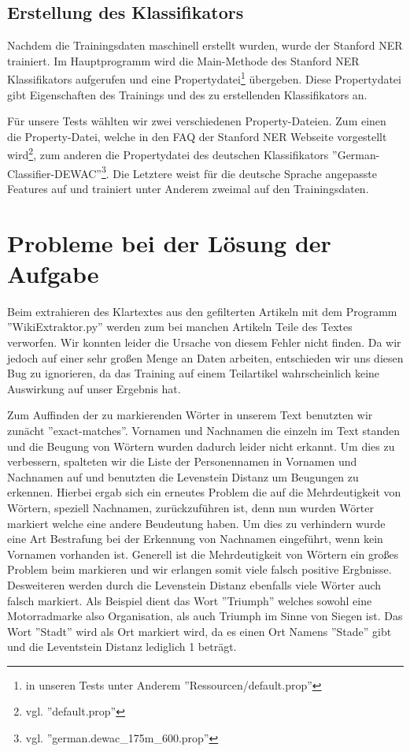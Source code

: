 \documentclass[a4paper]{article}
\begin{document}
	\subsection{Erstellung des Klassifikators}
		Nachdem die Trainingsdaten maschinell erstellt wurden, wurde der Stanford NER trainiert.
		Im Hauptprogramm wird die Main-Methode des Stanford NER Klassifikators aufgerufen und eine Propertydatei\footnote{in unseren Tests unter Anderem ''Ressourcen/default.prop''} übergeben. 
		Diese Propertydatei gibt Eigenschaften des Trainings und des zu erstellenden Klassifikators an. 
		
		Für unsere Tests wählten wir zwei verschiedenen Property-Dateien. 
		Zum einen die Property-Datei, welche in den FAQ der Stanford NER Webseite vorgestellt wird\footnote{vgl. ''default.prop''}, zum anderen die Propertydatei des deutschen Klassifikators ''German-Classifier-DEWAC''\footnote{vgl. ''german.dewac\_175m\_600.prop''}. 
		Die Letztere weist für die deutsche Sprache angepasste Features auf und trainiert unter Anderem zweimal auf den Trainingsdaten. 

\section{Probleme bei der Lösung der Aufgabe}
\label{Probleme}
	Beim extrahieren des Klartextes aus den gefilterten Artikeln mit dem Programm ''WikiExtraktor.py'' werden zum bei manchen Artikeln Teile des Textes verworfen. 
	Wir konnten leider die Ursache von diesem Fehler nicht finden. 
	Da wir jedoch auf einer sehr großen Menge an Daten arbeiten, entschieden wir uns diesen Bug zu ignorieren, da das Training auf einem Teilartikel wahrscheinlich keine Auswirkung auf unser Ergebnis hat.
	
	Zum Auffinden der zu markierenden Wörter in unserem Text benutzten wir zunächt ''exact-matches''. Vornamen und Nachnamen die einzeln im Text standen und die Beugung von Wörtern wurden dadurch leider nicht erkannt. 
	Um dies zu verbessern, spalteten wir die Liste der Personennamen in Vornamen und Nachnamen auf und benutzten die Levenstein Distanz um Beugungen zu erkennen. 
	Hierbei ergab sich ein erneutes Problem die auf die Mehrdeutigkeit von Wörtern, speziell Nachnamen, zurückzuführen ist, denn nun wurden Wörter markiert welche eine andere Beudeutung haben. 
	Um dies zu verhindern wurde eine Art Bestrafung bei der Erkennung von Nachnamen eingeführt, wenn kein Vornamen vorhanden ist. 
	Generell ist die Mehrdeutigkeit von Wörtern ein großes Problem beim markieren und wir erlangen somit viele falsch positive Ergbnisse. 
	Desweiteren werden durch die Levenstein Distanz ebenfalls viele Wörter auch falsch markiert. 
	Als Beispiel dient das Wort ''Triumph'' welches sowohl eine Motorradmarke also Organisation, als auch Triumph im Sinne von Siegen ist. Das Wort ''Stadt'' wird als Ort markiert wird, da es einen Ort Namens ''Stade'' gibt und die Leventstein Distanz lediglich 1 beträgt.
	
\end{document}
